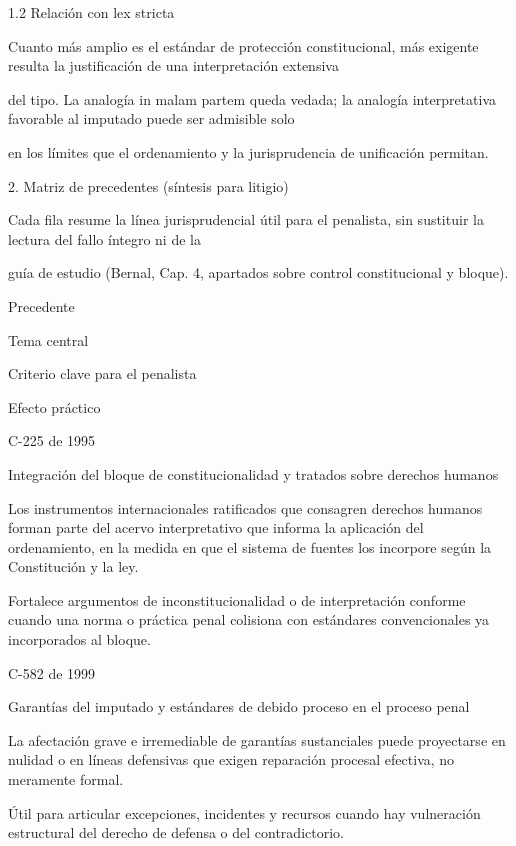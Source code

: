 \documentclass[11pt,a4paper]{article}
\begin{document}
        1.2 Relación con lex stricta\par

          Cuanto más amplio es el estándar de protección constitucional, más exigente resulta la justificación de una interpretación extensiva\par
          del tipo. La analogía in malam partem queda vedada; la analogía interpretativa favorable al imputado puede ser admisible solo\par
          en los límites que el ordenamiento y la jurisprudencia de unificación permitan.\par






      2. Matriz de precedentes (síntesis para litigio)\par


        Cada fila resume la línea jurisprudencial útil para el penalista, sin sustituir la lectura del fallo íntegro ni de la\par
        guía de estudio (Bernal, Cap. 4, apartados sobre control constitucional y bloque).\par





            Precedente\par
            Tema central\par
            Criterio clave para el penalista\par
            Efecto práctico\par






            C-225 de 1995\par
            Integración del bloque de constitucionalidad y tratados sobre derechos humanos\par
            Los instrumentos internacionales ratificados que consagren derechos humanos forman parte del acervo interpretativo que informa la aplicación del ordenamiento, en la medida en que el sistema de fuentes los incorpore según la Constitución y la ley.\par
            Fortalece argumentos de inconstitucionalidad o de interpretación conforme cuando una norma o práctica penal colisiona con estándares convencionales ya incorporados al bloque.\par



            C-582 de 1999\par
            Garantías del imputado y estándares de debido proceso en el proceso penal\par
            La afectación grave e irremediable de garantías sustanciales puede proyectarse en nulidad o en líneas defensivas que exigen reparación procesal efectiva, no meramente formal.\par
            Útil para articular excepciones, incidentes y recursos cuando hay vulneración estructural del derecho de defensa o del contradictorio.\par
\end{document}
